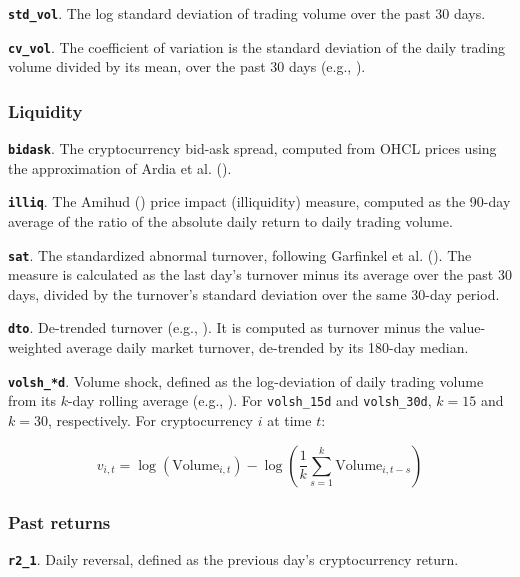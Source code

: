 \documentclass[
  12pt,
  a4paper,
  openany]{scrbook}
\begin{document}
\textbf{\texttt{std\_vol}}. The log standard deviation of trading volume
over the past 30 days.

\textbf{\texttt{cv\_vol}}. The coefficient of variation is the standard
deviation of the daily trading volume divided by its mean, over the past
30 days (e.g., ).

\subsubsection{Liquidity}\label{liquidity}

\textbf{\texttt{bidask}}. The cryptocurrency bid-ask spread, computed
from OHCL prices using the approximation of Ardia et al.
().

\textbf{\texttt{illiq}}. The Amihud
() price impact
(illiquidity) measure, computed as the 90-day average of the ratio of
the absolute daily return to daily trading volume.

\textbf{\texttt{sat}}. The standardized abnormal turnover, following
Garfinkel et al. ().
The measure is calculated as the last day's turnover minus its average
over the past 30 days, divided by the turnover's standard deviation over
the same 30-day period.

\textbf{\texttt{dto}}. De-trended turnover (e.g.,
). It is
computed as turnover minus the value-weighted average daily market
turnover, de-trended by its 180-day median.

\textbf{\texttt{volsh\_*d}}. Volume shock, defined as the log-deviation
of daily trading volume from its \(k\)-day rolling average (e.g.,
).
For \texttt{volsh\_15d} and \texttt{volsh\_30d}, \(k = 15\) and
\(k = 30\), respectively. For cryptocurrency \(i\) at time \(t\):

\[
v_{i,t} = \log(\text{Volume}_{i,t}) - \log\left( \frac{1}{k} \sum_{s=1}^{k} \text{Volume}_{i,t-s} \right)
\]

\subsubsection{Past returns}\label{past-returns}

\textbf{\texttt{r2\_1}}. Daily reversal, defined as the previous day's
cryptocurrency return.
\end{document}
